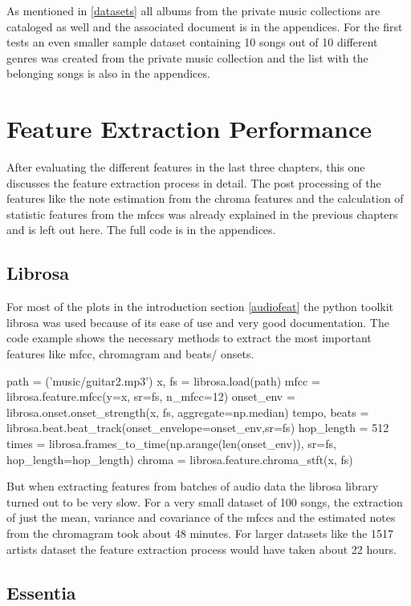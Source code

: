 As mentioned in \ref{datasets} all albums from the private music collections are cataloged as well and the associated document is in the appendices. For the first tests an even smaller sample dataset containing 10 songs out of 10 different genres was created from the private music collection and the list with the belonging songs is also in the appendices.

\section{Feature Extraction Performance}

After evaluating the different features in the last three chapters, this one discusses the feature extraction process in detail. The post processing of the features like the note estimation from the chroma features and the calculation of statistic features from the mfccs was already explained in the previous chapters and is left out here. The full code is in the appendices.

\subsection{Librosa}

For most of the plots in the introduction section \ref{audiofeat} the python toolkit librosa was used because of its ease of use and very good documentation. The code example shows the necessary methods to extract the most important features like mfcc, chromagram and beats/ onsets.
\lstset{language=Python} 
\begin{pythonCode}
path = ('music/guitar2.mp3')
x, fs = librosa.load(path)
mfcc = librosa.feature.mfcc(y=x, sr=fs, n_mfcc=12)
onset_env = librosa.onset.onset_strength(x, fs, aggregate=np.median)
tempo, beats = librosa.beat.beat_track(onset_envelope=onset_env,sr=fs)
hop_length = 512
times = librosa.frames_to_time(np.arange(len(onset_env)), sr=fs, hop_length=hop_length)
chroma = librosa.feature.chroma_stft(x, fs)
\end{pythonCode}	
But when extracting features from batches of audio data the librosa library turned out to be very slow. For a very small dataset of 100 songs, the extraction of just the mean, variance and covariance of the mfccs and the estimated notes from the chromagram took about 48 minutes. 
For larger datasets like the 1517 artists dataset the feature extraction process would have taken about 22 hours. 

\subsection{Essentia}

